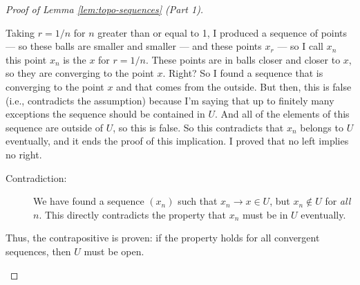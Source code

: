 \begin{proof}[Proof of Lemma \ref{lem:topo-sequences} (Part 1)]
\begin{math-stroke}
\begin{center}
\end{center}
\end{math-stroke}

\begin{spoken-clean}[00:23:12 - 00:25:30]
Taking $r = 1/n$ for $n$ greater than or equal to 1, I produced a sequence of points --- so these balls are smaller and smaller --- and these points $x_r$ --- so I call $x_n$ this point $x_n$ is the $x$ for $r = 1/n$. These points are in balls closer and closer to $x$, so they are converging to the point $x$. Right? So I found a sequence that is converging to the point $x$ and that comes from the outside. But then, this is false (i.e., contradicts the assumption) because I'm saying that up to finitely many exceptions the sequence should be contained in $U$. And all of the elements of this sequence are outside of $U$, so this is false. So this contradicts that $x_n$ belongs to $U$ eventually, and it ends the proof of this implication. I proved that no left implies no right.
\end{spoken-clean}

\begin{math-stroke}[Conclusion]
\begin{description}
    \item[Contradiction:] We have found a sequence $(x_n)$ such that $x_n \to x \in U$, but $x_n \notin U$ for \emph{all} $n$. This directly contradicts the property that $x_n$ must be in $U$ eventually.
\end{description}
Thus, the contrapositive is proven: if the  property holds for all convergent sequences, then $U$ must be open.
\end{math-stroke}

\end{proof}

